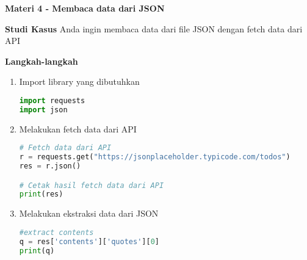 \documentclass{article}
\begin{document}
    \begin{flushleft}
        \textbf{Materi 4 - Membaca data dari JSON}
        \newline

        \textbf{Studi Kasus}
        \newline
        Anda ingin membaca data dari file JSON dengan fetch data dari API
        \newline

        \textbf{Langkah-langkah}

        \begin{enumerate}
            \item Import library yang dibutuhkan
            \lstset{style=pythonstyle}
            \begin{lstlisting}[language=python]
import requests
import json
            \end{lstlisting}

            \item Melakukan fetch data dari API
            \lstset{style=pythonstyle}
            \begin{lstlisting}[language=python]
# Fetch data dari API
r = requests.get("https://jsonplaceholder.typicode.com/todos")
res = r.json()

# Cetak hasil fetch data dari API
print(res)
            \end{lstlisting}

            \item Melakukan ekstraksi data dari JSON
            \lstset{style=pythonstyle}
            \begin{lstlisting}[language=python]
#extract contents
q = res['contents']['quotes'][0]
print(q)
            \end{lstlisting}
        \end{enumerate}
    \end{flushleft}
\end{document}

